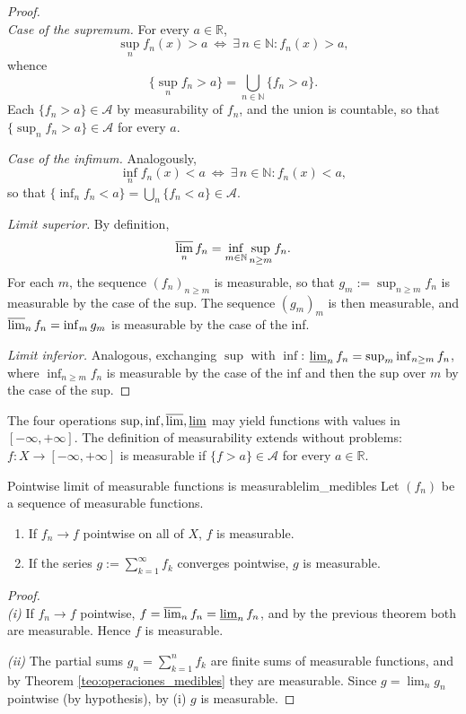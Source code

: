 \documentclass[11pt, a4paper]{article}
\begin{document}
\begin{proof}\leavevmode\\
\textit{Case of the supremum.} For every $a \in \mathbb{R}$,
$$ \sup_n f_n(x) > a \ \Leftrightarrow \ \exists \, n \in \mathbb{N} : f_n(x) > a, $$
whence
$$ \{\sup_n f_n > a\} = \bigcup_{n \in \mathbb{N}} \{f_n > a\}. $$
Each $\{f_n > a\} \in \mathcal{A}$ by measurability of $f_n$, and the union is countable, so that
$\{\sup_n f_n > a\} \in \mathcal{A}$ for every $a$.

\textit{Case of the infimum.} Analogously,
$$ \inf_n f_n(x) < a \ \Leftrightarrow \ \exists \, n \in \mathbb{N} : f_n(x) < a, $$
so that $\{\inf_n f_n < a\} = \bigcup_n \{f_n < a\} \in \mathcal{A}$.

\textit{Limit superior.} By definition,
$$ \varlimsup_n f_n = \inf_{m \in \mathbb{N}} \sup_{n \ge m} f_n. $$
For each $m$, the sequence $(f_n)_{n \ge m}$ is measurable, so that $g_m := \sup_{n \ge m} f_n$
is measurable by the case of the sup. The sequence $(g_m)_m$ is then measurable, and
$\varlimsup_n f_n = \inf_m g_m$ is measurable by the case of the inf.

\textit{Limit inferior.} Analogous, exchanging $\sup$ with $\inf$: $\varliminf_n f_n =
\sup_m \inf_{n \ge m} f_n$, where $\inf_{n \ge m} f_n$ is measurable by the case of the inf and then the
sup over $m$ by the case of the sup.
\end{proof}

\obs The four operations $\sup, \inf, \varlimsup, \varliminf$ may yield functions with values
in $[-\infty, +\infty]$. The definition of measurability extends without problems:
$f: X \to [-\infty,
+\infty]$ is measurable if $\{f > a\} \in \mathcal{A}$ for every $a \in \mathbb{R}$.

\begin{corolario}{Pointwise limit of measurable functions is measurable}{lim_medibles}
Let $(f_n)$ be a sequence of measurable functions.
\begin{enumerate}
    \item If $f_n \to f$ pointwise on all of $X$, $f$ is measurable.
    \item If the series $g := \sum_{k=1}^\infty f_k$ converges pointwise, $g$ is measurable.
\end{enumerate}
\end{corolario}

\begin{proof}\leavevmode\\
\textit{(i)} If $f_n \to f$ pointwise, $f = \varlimsup_n f_n = \varliminf_n f_n$, and by the
previous theorem both are measurable. Hence $f$ is measurable.

\textit{(ii)} The partial sums $g_n = \sum_{k=1}^n f_k$ are finite sums of measurable functions, and by
Theorem \ref{teo:operaciones_medibles} they are measurable. Since $g = \lim_n g_n$ pointwise (by
hypothesis), by (i) $g$ is measurable.
\end{proof}
\end{document}
